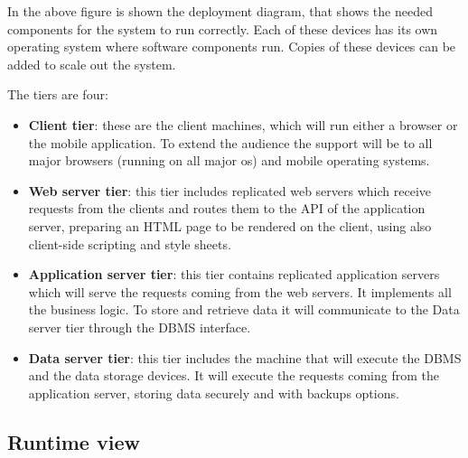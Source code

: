 \documentclass{article}
\begin{document}
    In the above figure is shown the deployment diagram, that shows the needed components for the system to run correctly. Each of these devices has its own operating system where software components run. Copies of these devices can be added to scale out the system. \par
    
    The tiers are four:
    \begin{itemize}
    
        \item \textbf{Client tier}: these are the client machines, which will run either a browser or the mobile application. To extend the audience the support will be to all major browsers (running on all major os) and mobile operating systems.
        
        \item \textbf{Web server tier}: this tier includes replicated web servers which receive requests from the clients and routes them to the API of the application server, preparing an HTML page to be rendered on the client, using also client-side scripting and style sheets.
        
        \item \textbf{Application server tier}: this tier contains replicated application servers which will serve the requests coming from the web servers. It implements all the business logic. To store and retrieve data it will communicate to the Data server tier through the DBMS interface.
        
        \item \textbf{Data server tier}: this tier includes the machine that will execute the DBMS and the data storage devices. It will execute the requests coming from the application server, storing data securely and with backups options.
        
    \end{itemize}
    

\newpage

\subsection{Runtime view}
\end{document}
